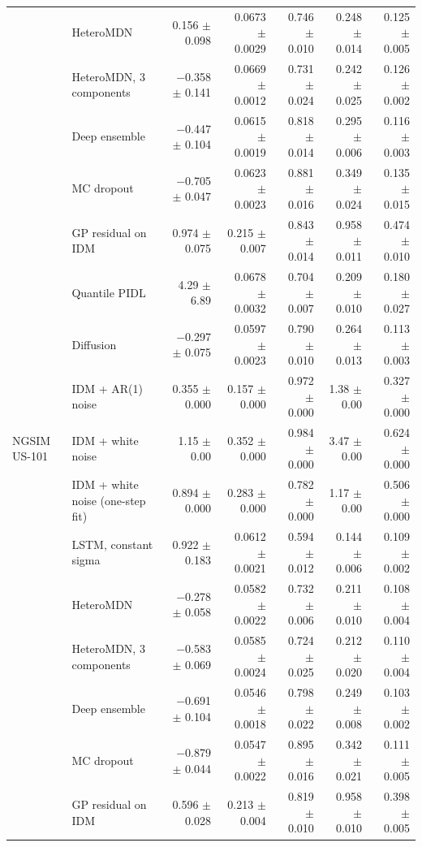 \begin{longtable}{llrrrrr}
 & HeteroMDN & 0.156 $\pm$ 0.098 & 0.0673 $\pm$ 0.0029 & 0.746 $\pm$ 0.010 & 0.248 $\pm$ 0.014 & 0.125 $\pm$ 0.005 \\
 & HeteroMDN, 3 components & $-$0.358 $\pm$ 0.141 & 0.0669 $\pm$ 0.0012 & 0.731 $\pm$ 0.024 & 0.242 $\pm$ 0.025 & 0.126 $\pm$ 0.002 \\
 & Deep ensemble & $-$0.447 $\pm$ 0.104 & 0.0615 $\pm$ 0.0019 & 0.818 $\pm$ 0.014 & 0.295 $\pm$ 0.006 & 0.116 $\pm$ 0.003 \\
 & MC dropout & $-$0.705 $\pm$ 0.047 & 0.0623 $\pm$ 0.0023 & 0.881 $\pm$ 0.016 & 0.349 $\pm$ 0.024 & 0.135 $\pm$ 0.015 \\
 & GP residual on IDM & 0.974 $\pm$ 0.075 & 0.215 $\pm$ 0.007 & 0.843 $\pm$ 0.014 & 0.958 $\pm$ 0.011 & 0.474 $\pm$ 0.010 \\
 & Quantile PIDL & 4.29 $\pm$ 6.89 & 0.0678 $\pm$ 0.0032 & 0.704 $\pm$ 0.007 & 0.209 $\pm$ 0.010 & 0.180 $\pm$ 0.027 \\
 & Diffusion & $-$0.297 $\pm$ 0.075 & 0.0597 $\pm$ 0.0023 & 0.790 $\pm$ 0.010 & 0.264 $\pm$ 0.013 & 0.113 $\pm$ 0.003 \\
 & IDM + AR(1) noise & 0.355 $\pm$ 0.000 & 0.157 $\pm$ 0.000 & 0.972 $\pm$ 0.000 & 1.38 $\pm$ 0.00 & 0.327 $\pm$ 0.000 \\
\midrule
NGSIM US-101 & IDM + white noise & 1.15 $\pm$ 0.00 & 0.352 $\pm$ 0.000 & 0.984 $\pm$ 0.000 & 3.47 $\pm$ 0.00 & 0.624 $\pm$ 0.000 \\
 & IDM + white noise (one-step fit) & 0.894 $\pm$ 0.000 & 0.283 $\pm$ 0.000 & 0.782 $\pm$ 0.000 & 1.17 $\pm$ 0.00 & 0.506 $\pm$ 0.000 \\
 & LSTM, constant sigma & 0.922 $\pm$ 0.183 & 0.0612 $\pm$ 0.0021 & 0.594 $\pm$ 0.012 & 0.144 $\pm$ 0.006 & 0.109 $\pm$ 0.002 \\
 & HeteroMDN & $-$0.278 $\pm$ 0.058 & 0.0582 $\pm$ 0.0022 & 0.732 $\pm$ 0.006 & 0.211 $\pm$ 0.010 & 0.108 $\pm$ 0.004 \\
 & HeteroMDN, 3 components & $-$0.583 $\pm$ 0.069 & 0.0585 $\pm$ 0.0024 & 0.724 $\pm$ 0.025 & 0.212 $\pm$ 0.020 & 0.110 $\pm$ 0.004 \\
 & Deep ensemble & $-$0.691 $\pm$ 0.104 & 0.0546 $\pm$ 0.0018 & 0.798 $\pm$ 0.022 & 0.249 $\pm$ 0.008 & 0.103 $\pm$ 0.002 \\
 & MC dropout & $-$0.879 $\pm$ 0.044 & 0.0547 $\pm$ 0.0022 & 0.895 $\pm$ 0.016 & 0.342 $\pm$ 0.021 & 0.111 $\pm$ 0.005 \\
 & GP residual on IDM & 0.596 $\pm$ 0.028 & 0.213 $\pm$ 0.004 & 0.819 $\pm$ 0.010 & 0.958 $\pm$ 0.010 & 0.398 $\pm$ 0.005 \\

\end{longtable}
